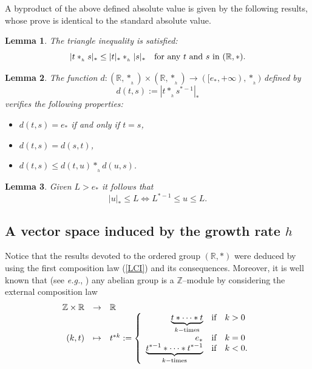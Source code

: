 \documentclass[10pt]{amsart}
\newtheorem{lemma}{Lemma}
\numberwithin{equation}{section}
\begin{document}
A byproduct of the above defined absolute value is given by the following results, whose
prove is identical to the standard absolute value.

\begin{lemma}{\label{desigTrian}}
The triangle inequality is satisfied:
\begin{equation}
\label{DT}
|t\ast_{_h}s|_{\ast} \leq |t|_{\ast} \ast_{_h}|s|_{\ast} \quad \textnormal{for any $t$ and $s$ in $(\mathbb{R},*)$}.
\end{equation}
\end{lemma}

\begin{lemma}{\label{metrica}}
The function $d \colon (\mathbb{R},\ast_{_h}) \times (\mathbb{R},\ast_{_h}) \to   ([e_{\ast},+\infty),\ast_{_h})$ defined by
\begin{equation}
\label{distance}
d(t,s):=|t\ast_{_h}s^{\ast -1}|_{\ast}
\end{equation}
verifies the following properties:
\begin{itemize}
    \item[d1)] $d(t,s)=e_{\ast}$ if and only if $t=s$,
    \item[d2)] $d(t,s)=d(s,t)$,
    \item[d3)] $d(t,s)\leq d(t,u)\ast_{_h}d(u,s)$.
\end{itemize}    
\end{lemma}

\begin{lemma} 
\label{L4}
Given $L>e_{\ast}$ it follows that
\begin{equation*}
|u|_{\ast}\leq L  \iff L^{\ast-1}\leq u \leq L.
\end{equation*}
\end{lemma}


\subsection{A vector space induced by the growth rate $h$}
Notice that the results devoted to the ordered group $(\mathbb{R},*)$ were deduced
by using the first composition law (\ref{LCI}) and its consequences. Moreover, it is well known that
(see \emph{e.g.}, \cite[p.11]{Bourbaki}) any abelian group is a $\mathbb{Z}$--module by considering
the external composition law
\begin{equation*}
\begin{array}{rcl}
\mathbb{Z} \times \mathbb{R} & \to &  \mathbb{R}  \\
(k,t) &\mapsto &  t^{*k}:=\left\{\begin{array}{rcl}
 \underbrace{t \ast \cdots \ast t}_{k-\textnormal{times}} &\textnormal{if}& k>0 \\
 e_{\ast}  &\textnormal{if}&  k=0 \\
 \underbrace{t^{\ast -1} \ast \cdots \ast t^{\ast -1}}_{k-\textnormal{times}} &\textnormal{if}& k<0.
 \end{array}\right.
\end{array} 
\end{equation*}
\end{document}
